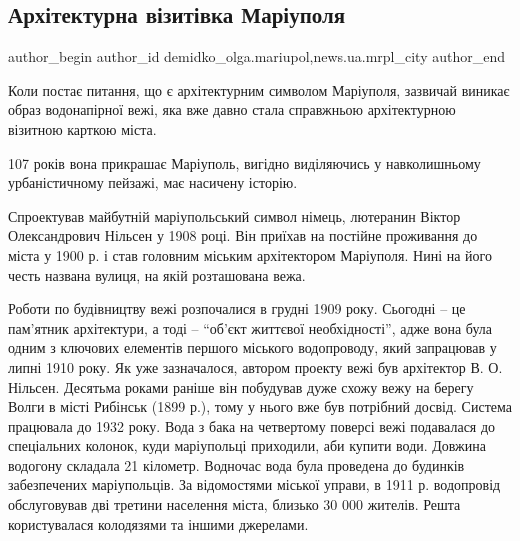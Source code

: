 
 
 
 
 
 
\subsection{Архітектурна візитівка Маріуполя}
\label{sec:10_11_2017.stz.news.ua.mrpl_city.1.arhitekturna_vizitivka_mariupolja}
 
\ifcmt
 author_begin
   author_id demidko_olga.mariupol,news.ua.mrpl_city
 author_end
\fi

Коли постає питання, що є архітектурним символом Маріуполя, зазвичай виникає
образ водонапірної вежі, яка вже давно стала справжньою архітектурною візитною
карткою міста.


107 років вона прикрашає Маріуполь, вигідно виділяючись у навколишньому
урбаністичному пейзажі, має насичену історію.

Спроектував майбутній маріупольський символ німець, лютеранин Віктор
Олександрович Нільсен у 1908 році. Він приїхав на постійне проживання до міста
у 1900 р. і став головним міським архітектором Маріуполя. Нині на його честь
названа вулиця, на якій розташована вежа.

Роботи по будівництву вежі розпочалися в грудні 1909 року. Сьогодні – це
пам'ятник архітектури, а тоді – \enquote{об'єкт життєвої необхідності}, адже вона була
одним з ключових елементів першого міського водопроводу, який запрацював у
липні 1910 року. Як уже зазначалося, автором проекту вежі був архітектор В. О.
Нільсен. Десятьма роками раніше він побудував дуже схожу вежу на берегу Волги в
місті Рибінськ (1899 р.), тому у нього вже був потрібний досвід. Система
працювала до 1932 року. Вода з бака  на четвертому поверсі вежі подавалася до
спеціальних колонок, куди маріупольці приходили, аби купити води. Довжина
водогону складала 21 кілометр. Водночас вода була проведена до будинків
забезпечених маріупольців. За відомостями міської управи, в 1911 р. водопровід
обслуговував дві третини населення міста, близько 30 000 жителів. Решта
користувалася колодязями та іншими джерелами.

